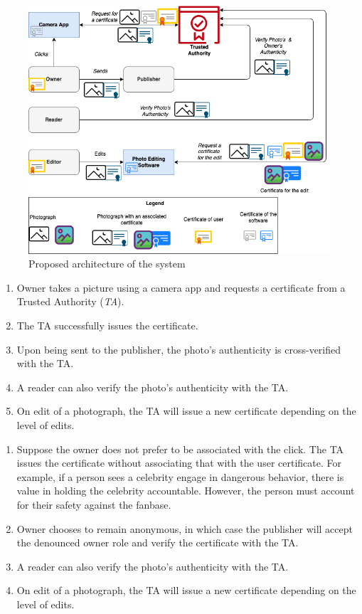 \documentclass[10pt]{article}
\begin{document}
\begin{figure}[H]
\centering
\includegraphics[scale=0.38]{arch.png}
\caption{Proposed architecture of the system}
\label{fig:arch}
\end{figure}

\begin{enumerate}
\item Owner takes a picture using a camera app and requests a certificate from a Trusted Authority ({\em TA}).
\item The TA successfully issues the certificate. 
\item Upon being sent to the publisher, the photo's authenticity is cross-verified with the TA.
\item A reader can also verify the photo's authenticity with the TA. 
\item On edit of a photograph, the TA will issue a new certificate depending on the level of edits. 
\end{enumerate}

\begin{enumerate}
\item Suppose the owner does not prefer to be associated with the click. The TA issues the certificate without associating that with the user certificate. For example, if a person sees a celebrity engage in dangerous behavior, there is value in holding the celebrity accountable. However, the person must account for their safety against the fanbase. 
\item Owner chooses to remain anonymous, in which case the publisher will accept the denounced owner role and verify the certificate with the TA. 
\item A reader can also verify the photo's authenticity with the TA. 
\item On edit of a photograph, the TA will issue a new certificate depending on the level of edits. 
\end{enumerate}
\end{document}
